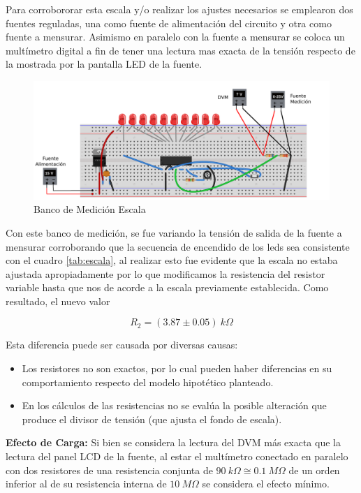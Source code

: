 \documentclass[12pt,a4paper]{article}
\begin{document}
			Para corrobororar esta escala y/o realizar los ajustes necesarios se emplearon dos fuentes reguladas, una como fuente de alimentación del circuito y otra como fuente a mensurar. Asimismo en paralelo con la fuente a mensurar se coloca un multímetro digital a fin de tener una lectura mas exacta de la tensión respecto de la mostrada por la pantalla LED de la fuente.

			\begin{figure}[H]
			\centering
				\includegraphics[scale=0.8]{images/banco1.pdf}\caption{Banco de Medición Escala}\label{fig:banco1}
			\end{figure}

			Con este banco de medición, se fue variando la tensión de salida de la fuente a mensurar corroborando que la secuencia de encendido de los leds sea consistente con el cuadro \ref{tab:escala}, al realizar esto fue evidente que la escala no estaba ajustada apropiadamente por lo que modificamos la resistencia del resistor variable hasta que nos de acorde a la escala previamente establecida. Como resultado, el nuevo valor

			\begin{equation}
				R_2 = (3.87 \pm 0.05) \: k \Omega
			\end{equation}

			Esta diferencia puede ser causada por diversas causas:
			\begin{itemize}
				\item Los resistores no son exactos, por lo cual pueden haber diferencias en su comportamiento respecto del modelo hipotético planteado.

				\item En los cálculos de las resistencias no se evalúa la posible alteración que produce el divisor de tensión (que ajusta el fondo de escala).


			\end{itemize}

			\textbf{Efecto de Carga:} Si bien se considera la lectura del DVM más exacta que la lectura del panel LCD de la fuente, al estar el multímetro conectado en paralelo con dos resistores de una resistencia conjunta de $90 \: k\Omega \cong 0.1 \: M\Omega$ de un orden inferior al de su resistencia interna de $10 \: M\Omega$ se considera el efecto mínimo.
\end{document}
